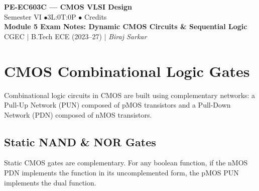 \documentclass[12pt,a4paper]{article}
\begin{document}

\begin{center}
  {\LARGE\bfseries\color{myred} PE-EC603C --- CMOS VLSI Design}\\[5pt]
  {\normalsize\color{mydark} Semester VI \quad$\bullet$\quad 3L:0T:0P \quad$\bullet$ Credits}\\[3pt]
  {\normalsize\color{myteal}\textbf{Module 5 Exam Notes: Dynamic CMOS Circuits \& Sequential Logic}}\\[3pt]
  {\small\color{mydark} CGEC \;$|$\; B.Tech ECE (2023--27) \;$|$\; \textit{Biraj Sarkar}}
\end{center}
\vspace{2pt}
\noindent{\color{myred}\rule{\linewidth}{1.5pt}}
\vspace{2pt}

\hypersetup{linkcolor=mydark}
\tableofcontents
\hypersetup{linkcolor=myteal}
\newpage

\section{CMOS Combinational Logic Gates}

Combinational logic circuits in CMOS are built using complementary networks: a Pull-Up Network (PUN) composed of pMOS transistors and a Pull-Down Network (PDN) composed of nMOS transistors.

\subsection{Static NAND \& NOR Gates}
Static CMOS gates are complementary. For any boolean function, if the nMOS PDN implements the function in its uncomplemented form, the pMOS PUN implements the dual function.
\end{document}
